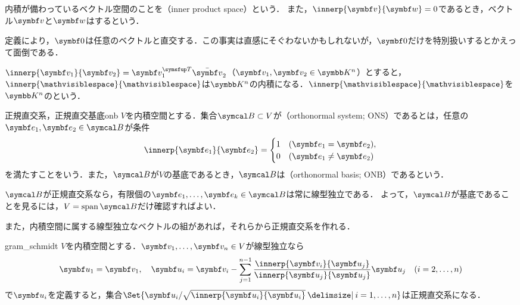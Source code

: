 \documentclass[../../main]{subfiles}
\begin{document}
内積が備わっているベクトル空間のことを（inner product space）という．
また，\(\innerp{\vect{v}}{\vect{w}}=0\)であるとき，ベクトル\(\vect{v}\)と\(\vect{w}\)はするという．

\begin{note}
  定義により，\(\zvec\)は任意のベクトルと直交する．この事実は直感にそぐわないかもしれないが，\(\zvec\)だけを特別扱いするとかえって面倒である．
\end{note}

\begin{example}[標準内積]
  \(\innerp{\vect{v}_1}{\vect{v}_2}=\trps{\vect{v}_1}\conj{\vect{v}}_2\)（\(\vect{v}_1,\vect{v}_2\in\numset{K}^n\)）とすると，
  \(\innerp{\holder}{\holder}\)は\(\numset{K}^n\)の内積になる．\(\innerp{\holder}{\holder}\)を\(\numset{K}^n\)のという．
\end{example}

\begin{definition}{正規直交系，正規直交基底}{onb}
  \(V\)を内積空間とする．集合\(\basis{B}\subset V\)が（orthonormal system; ONS）であるとは，任意の\(\vect{e}_1,\vect{e}_2\in\basis{B}\)が条件
  \[
    \innerp{\vect{e}_1}{\vect{e}_2} = \begin{cases}1 & (\vect{e}_1=\vect{e}_2),\\ 0 & (\vect{e}_1\neq\vect{e}_2)\end{cases}
  \]
  を満たすことをいう．また，\(\basis{B}\)が\(V\)の基底であるとき，\(\basis{B}\)は（orthonormal basis; ONB）であるという．
\end{definition}

\(\basis{B}\)が正規直交系なら，有限個の\(\vect{e}_1,\dots,\vect{e}_k\in\basis{B}\)は常に線型独立である．
よって，\(\basis{B}\)が基底であることを見るには，\(V=\spannedby\basis{B}\)だけ確認すればよい．

また，内積空間に属する線型独立なベクトルの組があれば，それらから正規直交系を作れる．

\begin{proposition}{}{gram_schmidt}
  \(V\)を内積空間とする．\(\vect{v}_1,\dots,\vect{v}_n\in V\)が線型独立なら
  \[
    \vect{u}_1 = \vect{v}_1,
    \quad\vect{u}_i = \vect{v}_i-\sum_{j=1}^{n-1}\frac{\innerp{\vect{v}_i}{\vect{u}_j}}{\innerp{\vect{u}_j}{\vect{u}_j}}\vect{u}_j\quad(i=2,\dots,n)
  \]
  で\(\vect{u}_i\)を定義すると，集合\(\Set{\vect{u}_i/\sqrt{\innerp{\vect{u}_i}{\vect{u}_i}}\given i=1,\dots,n}\)は正規直交系になる．
\end{proposition}
\end{document}
